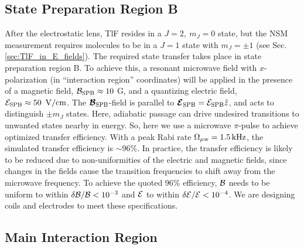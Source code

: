 \subsection{State Preparation Region B}
\label{sec:state_preparation_B}
After the electrostatic lens, TlF resides in a $J=2,~m_J=0$ state, but the NSM measurement requires molecules to be in a $J=1$ state with $m_J=\pm1$ \cite{wilkening1984search,hinds1980experiment} (see Sec. \ref{sec:TlF_in_E_fields}). The required state transfer takes place in state preparation region B. To achieve this, a resonant microwave field with $x$-polarization (in ``interaction region'' coordinates) will be applied in the presence of a magnetic field, $\mathcal{B}_{\rm SPB} \approx 10$ G, and a quantizing electric field, $\mathcal{E}_{\rm SPB} \approx 50~\,\mathrm{V/cm}$. The $\bm{\mathcal{B}}_{\rm SPB}$-field is parallel to $\bm{\mathcal{E}}_{\rm SPB} = \mathcal{E}_{\rm SPB}\hat{z}$, and acts to distinguish $\pm m_J$ states. Here, adiabatic passage can drive undesired transitions to unwanted states nearby in energy. So, here we use a microwave $\pi$-pulse to achieve optimized transfer efficiency. With a peak Rabi rate $\Omega_\text{$\mu$w} = 1.5\,\mathrm{kHz}$, the simulated transfer efficiency is $\sim\! 96\%$. In practice, the transfer efficiency is likely to be reduced due to non-uniformities of the electric and magnetic fields, since changes in the fields cause the transition frequencies to shift away from the microwave frequency. To achieve the quoted 96\% efficiency, $\mathcal{B}$ needs to be uniform to within $\delta\mathcal{B}/\mathcal{B} < 10^{-3}$ and $\mathcal{E}$ to within $\delta\mathcal{E}/\mathcal{E} < 10^{-4}$. We are designing coils and electrodes to meet these specifications.

\subsection{Main Interaction Region}
\label{sec:interaction_region}

